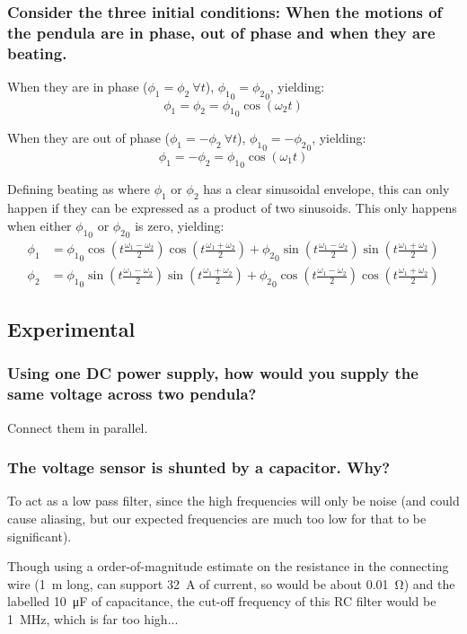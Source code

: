 \documentclass[a4paper]{scrartcl}
\begin{document}
\subsubsection{Consider the three initial conditions: When the motions of the pendula are in phase, out of phase and when they are beating.}
When they are in phase (\(\phi_1 = \phi_2 \:\forall t\)), \({\phi_1}_0 = {\phi_2}_0\), yielding:
\[\phi_1 = \phi_2 = {\phi_1}_0 \cos(\omega_2 t)\]

When they are out of phase (\(\phi_1 = -\phi_2 \:\forall t\)), \({\phi_1}_0 = -{\phi_2}_0\), yielding:
\[\phi_1 = -\phi_2 = {\phi_1}_0 \cos(\omega_1 t)\]

Defining beating as where \(\phi_1\) or \(\phi_2\) has a clear sinusoidal envelope, this can only happen if they can be expressed as a product of two sinusoids. This only happens when either \({\phi_1}_0\) or \({\phi_2}_0\) is zero, yielding:
\begin{align*}
    \phi_1 &= {\phi_1}_0 \cos \left(t \frac{\omega_1 - \omega_2}{2}\right) \cos \left(t \frac{\omega_1 + \omega_2}{2}\right) + {\phi_2}_0 \sin \left(t \frac{\omega_1 - \omega_2}{2}\right) \sin \left(t \frac{\omega_1 + \omega_2}{2}\right) \\
    \phi_2 &= {\phi_1}_0 \sin \left(t \frac{\omega_1 - \omega_2}{2}\right) \sin \left(t \frac{\omega_1 + \omega_2}{2}\right) + {\phi_2}_0 \cos \left(t \frac{\omega_1 - \omega_2}{2}\right) \cos \left(t \frac{\omega_1 + \omega_2}{2}\right)
\end{align*}

\subsection{Experimental}
\subsubsection{Using one DC power supply, how would you supply the same voltage across two pendula?}
Connect them in parallel.

\subsubsection{The voltage sensor is shunted by a capacitor. Why?}
To act as a low pass filter, since the high frequencies will only be noise (and could cause aliasing, but our expected frequencies are much too low for that to be significant).

Though using a order-of-magnitude estimate on the resistance in the connecting wire (\SI{1}{\meter} long, can support \SI{32}{\ampere} of current, so would be about \SI{0.01}{\ohm}) and the labelled \SI{10}{\micro\farad} of capacitance, the cut-off frequency of this RC filter would be \SI{1}{\mega\hertz}, which is far too high...
\end{document}
